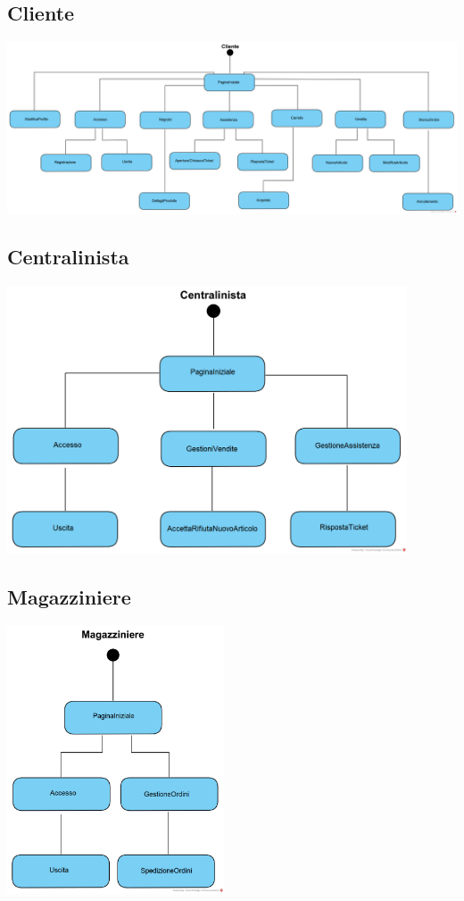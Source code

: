\documentclass[12pt,a4paper]{article}
\begin{document}
\subsection{Cliente}
\begin{center}
\includegraphics[width=\textwidth]{NavigationalPath/Cliente}
\end{center}

\subsection{Centralinista}
\begin{center}
\includegraphics[height=300px]{NavigationalPath/Centralinista}
\end{center}

\subsection{Magazziniere}
\begin{center}
\includegraphics[height=300px]{NavigationalPath/Magazziniere}
\end{center}
\end{document}
